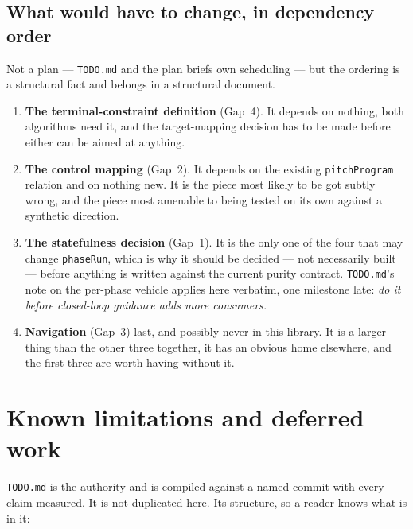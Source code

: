 \documentclass[11pt]{article}
\newcommand{\code}[1]{\texttt{#1}}
\begin{document}
\subsection{What would have to change, in dependency order}

Not a plan --- \code{TODO.md} and the plan briefs own scheduling --- but the
ordering is a structural fact and belongs in a structural document.

\begin{enumerate}
\item \textbf{The terminal-constraint definition} (Gap~4). It depends on
nothing, both algorithms need it, and the target-mapping decision has to be
made before either can be aimed at anything.
\item \textbf{The control mapping} (Gap~2). It depends on the existing
\code{pitchProgram} relation and on nothing new. It is the piece most likely
to be got subtly wrong, and the piece most amenable to being tested on its own
against a synthetic direction.
\item \textbf{The statefulness decision} (Gap~1). It is the only one of the
four that may change \code{phaseRun}, which is why it should be decided ---
not necessarily built --- before anything is written against the current
purity contract. \code{TODO.md}'s note on the per-phase vehicle applies here
verbatim, one milestone late: \emph{do it before closed-loop guidance adds
more consumers.}
\item \textbf{Navigation} (Gap~3) last, and possibly never in this library. It
is a larger thing than the other three together, it has an obvious home
elsewhere, and the first three are worth having without it.
\end{enumerate}

\section{Known limitations and deferred work}
\label{sec:limits}

\code{TODO.md} is the authority and is compiled against a named commit with
every claim measured. It is not duplicated here. Its structure, so a reader
knows what is in it:
\end{document}
